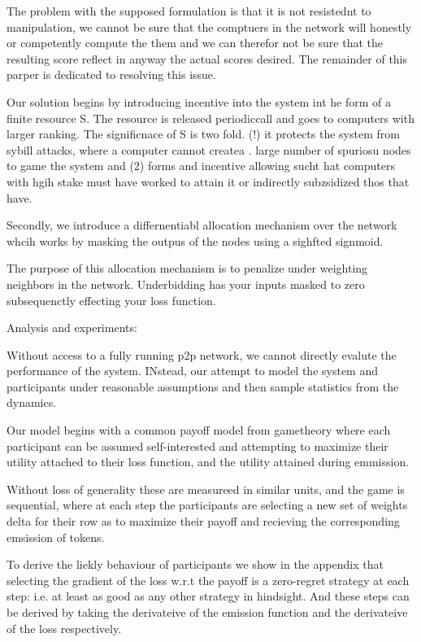 \documentclass{article}
\begin{document}
The problem with the supposed formulation is that it is not resistednt to manipulation, we cannot be sure that the comptuers in the network will honestly or competently compute the them and we can therefor not be sure that the resulting score reflect in anyway the actual scores desired. The remainder of this parper is dedicated to resolving this issue.


Our solution begins by introducing incentive into the system int he form of a finite resource S. The resource is released periodiccall and goes to computers with larger ranking. The significnace of S is two fold. (!) it protects the system from sybill attacks, where a computer cannot createa . large number of spuriosu nodes to game the system and (2) forms and incentive allowing sucht hat computers with hgih stake must have worked to attain it or indirectly subzsidized thos that have.

Secondly, we introduce a differnentiabl allocation mechanism over the network whcih works by masking the outpus of the nodes using a sighfted signmoid. 

The purpose of this allocation mechanism is to penalize under weighting neighbors in the network. Underbidding has your inputs masked to zero subsequenctly effecting your loss function. 

Analysis and experiments:

Without access to a fully running p2p network, we cannot directly evalute the performance of the system. INstead, our attempt to model the system and participants under reasonable assumptions and then sample statistics from the dynamics. 

Our model begins with a common payoff model from gametheory where each participant can be assumed self-interested and attempting to maximize their utility attached to their loss function, and the utility attained during emmission. 

Without loss of generality these are measureed in similar units, and the game is sequential, where at each step the participants are selecting a new set of weights delta for their row as to maximize their payoff and recieving the corresponding emsission of tokens.

To derive the liekly behaviour of participants we show in the appendix that selecting the gradient of the loss w.r.t the payoff is a zero-regret strategy at each step: i.e. at least as good as any other strategy in hindsight. And these steps can be derived by taking the derivateive of the emission function and the derivateive of the loss respectively. 
\end{document}
